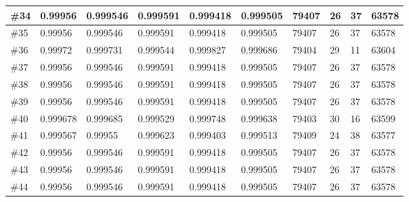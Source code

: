 \begin{longtable}{l|l|l|l|l|l|l|l|l|l}
\#34 & 0.99956  & 0.999546 & 0.999591 & 0.999418 & 0.999505 & 79407 & 26  & 37  & 63578 \\ \hline
\#35 & 0.99956  & 0.999546 & 0.999591 & 0.999418 & 0.999505 & 79407 & 26  & 37  & 63578 \\ \hline
\#36 & 0.99972  & 0.999731 & 0.999544 & 0.999827 & 0.999686 & 79404 & 29  & 11  & 63604 \\ \hline
\#37 & 0.99956  & 0.999546 & 0.999591 & 0.999418 & 0.999505 & 79407 & 26  & 37  & 63578 \\ \hline
\#38 & 0.99956  & 0.999546 & 0.999591 & 0.999418 & 0.999505 & 79407 & 26  & 37  & 63578 \\ \hline
\#39 & 0.99956  & 0.999546 & 0.999591 & 0.999418 & 0.999505 & 79407 & 26  & 37  & 63578 \\ \hline
\#40 & 0.999678 & 0.999685 & 0.999529 & 0.999748 & 0.999638 & 79403 & 30  & 16  & 63599 \\ \hline
\#41 & 0.999567 & 0.99955  & 0.999623 & 0.999403 & 0.999513 & 79409 & 24  & 38  & 63577 \\ \hline
\#42 & 0.99956  & 0.999546 & 0.999591 & 0.999418 & 0.999505 & 79407 & 26  & 37  & 63578 \\ \hline
\#43 & 0.99956  & 0.999546 & 0.999591 & 0.999418 & 0.999505 & 79407 & 26  & 37  & 63578 \\ \hline
\#44 & 0.99956  & 0.999546 & 0.999591 & 0.999418 & 0.999505 & 79407 & 26  & 37  & 63578 \\ \hline


\end{longtable}




















